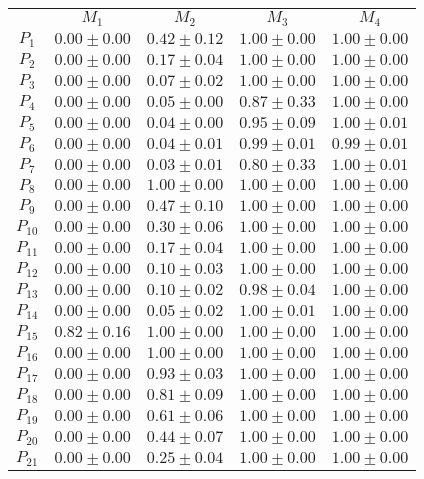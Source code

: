 \documentclass[12pt]{article}
\begin{document}
\begin{appendices}
\begin{table}[H]
\begin{tabular}{ccccc}
 & $M_{1}$  & $M_{2}$  & $M_{3}$  & $M_{4}$ \\ \cline{2-5}
$P_{1}$  & $0.00\pm0.00$  & $0.42\pm0.12$  & $1.00\pm0.00$  & $1.00\pm0.00$ \\
$P_{2}$  & $0.00\pm0.00$  & $0.17\pm0.04$  & $1.00\pm0.00$  & $1.00\pm0.00$ \\
$P_{3}$  & $0.00\pm0.00$  & $0.07\pm0.02$  & $1.00\pm0.00$  & $1.00\pm0.00$ \\
$P_{4}$  & $0.00\pm0.00$  & $0.05\pm0.00$  & $0.87\pm0.33$  & $1.00\pm0.00$ \\
$P_{5}$  & $0.00\pm0.00$  & $0.04\pm0.00$  & $0.95\pm0.09$  & $1.00\pm0.01$ \\
$P_{6}$  & $0.00\pm0.00$  & $0.04\pm0.01$  & $0.99\pm0.01$  & $0.99\pm0.01$ \\
$P_{7}$  & $0.00\pm0.00$  & $0.03\pm0.01$  & $0.80\pm0.33$  & $1.00\pm0.01$ \\
$P_{8}$  & $0.00\pm0.00$  & $1.00\pm0.00$  & $1.00\pm0.00$  & $1.00\pm0.00$ \\
$P_{9}$  & $0.00\pm0.00$  & $0.47\pm0.10$  & $1.00\pm0.00$  & $1.00\pm0.00$ \\
$P_{10}$  & $0.00\pm0.00$  & $0.30\pm0.06$  & $1.00\pm0.00$  & $1.00\pm0.00$ \\
$P_{11}$  & $0.00\pm0.00$  & $0.17\pm0.04$  & $1.00\pm0.00$  & $1.00\pm0.00$ \\
$P_{12}$  & $0.00\pm0.00$  & $0.10\pm0.03$  & $1.00\pm0.00$  & $1.00\pm0.00$ \\
$P_{13}$  & $0.00\pm0.00$  & $0.10\pm0.02$  & $0.98\pm0.04$  & $1.00\pm0.00$ \\
$P_{14}$  & $0.00\pm0.00$  & $0.05\pm0.02$  & $1.00\pm0.01$  & $1.00\pm0.00$ \\
$P_{15}$  & $0.82\pm0.16$  & $1.00\pm0.00$  & $1.00\pm0.00$  & $1.00\pm0.00$ \\
$P_{16}$  & $0.00\pm0.00$  & $1.00\pm0.00$  & $1.00\pm0.00$  & $1.00\pm0.00$ \\
$P_{17}$  & $0.00\pm0.00$  & $0.93\pm0.03$  & $1.00\pm0.00$  & $1.00\pm0.00$ \\
$P_{18}$  & $0.00\pm0.00$  & $0.81\pm0.09$  & $1.00\pm0.00$  & $1.00\pm0.00$ \\
$P_{19}$  & $0.00\pm0.00$  & $0.61\pm0.06$  & $1.00\pm0.00$  & $1.00\pm0.00$ \\
$P_{20}$  & $0.00\pm0.00$  & $0.44\pm0.07$  & $1.00\pm0.00$  & $1.00\pm0.00$ \\
$P_{21}$  & $0.00\pm0.00$  & $0.25\pm0.04$  & $1.00\pm0.00$  & $1.00\pm0.00$ \\

\end{tabular}
\end{table}
\end{appendices}
\end{document}
